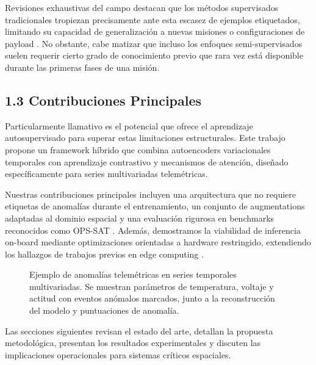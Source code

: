 Revisiones exhaustivas del campo destacan que los métodos supervisados tradicionales tropiezan precisamente ante esta escasez de ejemplos etiquetados, limitando su capacidad de generalización a nuevas misiones o configuraciones de payload \cite{Fejjari2025_Review}. No obstante, cabe matizar que incluso los enfoques semi-supervisados suelen requerir cierto grado de conocimiento previo que rara vez está disponible durante las primeras fases de una misión.

\subsection{1.3 Contribuciones Principales}

Particularmente llamativo es el potencial que ofrece el aprendizaje autosupervisado para superar estas limitaciones estructurales. Este trabajo propone un framework híbrido que combina autoencoders variacionales temporales con aprendizaje contrastivo y mecanismos de atención, diseñado específicamente para series multivariadas telemétricas.

Nuestras contribuciones principales incluyen una arquitectura que no requiere etiquetas de anomalías durante el entrenamiento, un conjunto de augmentations adaptadas al dominio espacial y una evaluación rigurosa en benchmarks reconocidos como OPS-SAT \cite{Ruszczak2025_OPSSAT}. Además, demostramos la viabilidad de inferencia on-board mediante optimizaciones orientadas a hardware restringido, extendiendo los hallazgos de trabajos previos en edge computing \cite{Goetze2026_Edge}.

\begin{figure}[h]
\centering
\scalebox{0.9}{}
\caption{Ejemplo de anomalías telemétricas en series temporales multivariadas. Se muestran parámetros de temperatura, voltaje y actitud con eventos anómalos marcados, junto a la reconstrucción del modelo y puntuaciones de anomalía.}
\label{fig:anomalies}
\end{figure}

Las secciones siguientes revisan el estado del arte, detallan la propuesta metodológica, presentan los resultados experimentales y discuten las implicaciones operacionales para sistemas críticos espaciales.